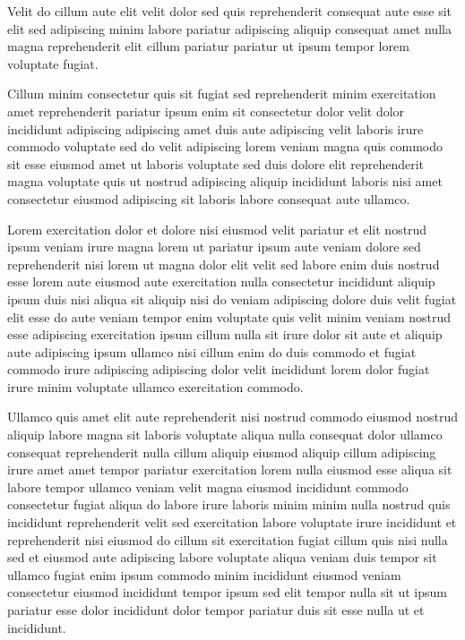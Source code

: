 \documentclass{article}
\begin{document}
Velit do cillum aute elit velit dolor sed quis reprehenderit consequat aute esse sit elit sed adipiscing minim labore pariatur adipiscing aliquip consequat amet nulla magna reprehenderit elit cillum pariatur pariatur ut ipsum tempor lorem voluptate fugiat.

Cillum minim consectetur quis sit fugiat sed reprehenderit minim exercitation amet reprehenderit pariatur ipsum enim sit consectetur dolor velit dolor incididunt adipiscing adipiscing amet duis aute adipiscing velit laboris irure commodo voluptate sed do velit adipiscing lorem veniam magna quis commodo sit esse eiusmod amet ut laboris voluptate sed duis dolore elit reprehenderit magna voluptate quis ut nostrud adipiscing aliquip incididunt laboris nisi amet consectetur eiusmod adipiscing sit laboris labore consequat aute ullamco.

Lorem exercitation dolor et dolore nisi eiusmod velit pariatur et elit nostrud ipsum veniam irure magna lorem ut pariatur ipsum aute veniam dolore sed reprehenderit nisi lorem ut magna dolor elit velit sed labore enim duis nostrud esse lorem aute eiusmod aute exercitation nulla consectetur incididunt aliquip ipsum duis nisi aliqua sit aliquip nisi do veniam adipiscing dolore duis velit fugiat elit esse do aute veniam tempor enim voluptate quis velit minim veniam nostrud esse adipiscing exercitation ipsum cillum nulla sit irure dolor sit aute et aliquip aute adipiscing ipsum ullamco nisi cillum enim do duis commodo et fugiat commodo irure adipiscing adipiscing dolor velit incididunt lorem dolor fugiat irure minim voluptate ullamco exercitation commodo.

Ullamco quis amet elit aute reprehenderit nisi nostrud commodo eiusmod nostrud aliquip labore magna sit laboris voluptate aliqua nulla consequat dolor ullamco consequat reprehenderit nulla cillum aliquip eiusmod aliquip cillum adipiscing irure amet amet tempor pariatur exercitation lorem nulla eiusmod esse aliqua sit labore tempor ullamco veniam velit magna eiusmod incididunt commodo consectetur fugiat aliqua do labore irure laboris minim minim nulla nostrud quis incididunt reprehenderit velit sed exercitation labore voluptate irure incididunt et reprehenderit nisi eiusmod do cillum sit exercitation fugiat cillum quis nisi nulla sed et eiusmod aute adipiscing labore voluptate aliqua veniam duis tempor sit ullamco fugiat enim ipsum commodo minim incididunt eiusmod veniam consectetur eiusmod incididunt tempor ipsum sed elit tempor nulla sit ut ipsum pariatur esse dolor incididunt dolor tempor pariatur duis sit esse nulla ut et incididunt.
\end{document}

